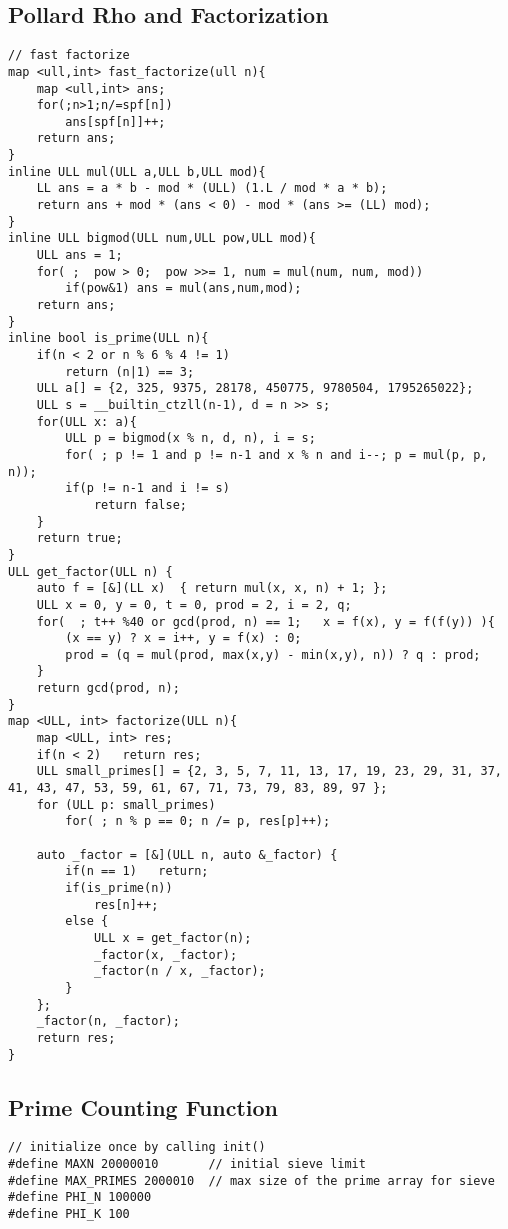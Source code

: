 \documentclass[10pt,a4paper,onesided]{article}
\begin{document}
\begin{multicols*}{3}
\subsection{Pollard Rho and Factorization}
\begin{lstlisting}
// fast factorize
map <ull,int> fast_factorize(ull n){
    map <ull,int> ans;
    for(;n>1;n/=spf[n])
        ans[spf[n]]++;
    return ans;
}
inline ULL mul(ULL a,ULL b,ULL mod){
    LL ans = a * b - mod * (ULL) (1.L / mod * a * b);
    return ans + mod * (ans < 0) - mod * (ans >= (LL) mod);
}
inline ULL bigmod(ULL num,ULL pow,ULL mod){
    ULL ans = 1;
    for( ;  pow > 0;  pow >>= 1, num = mul(num, num, mod))
        if(pow&1) ans = mul(ans,num,mod);
    return ans;
}
inline bool is_prime(ULL n){
    if(n < 2 or n % 6 % 4 != 1) 
        return (n|1) == 3;
    ULL a[] = {2, 325, 9375, 28178, 450775, 9780504, 1795265022};
    ULL s = __builtin_ctzll(n-1), d = n >> s;
    for(ULL x: a){
        ULL p = bigmod(x % n, d, n), i = s;
        for( ; p != 1 and p != n-1 and x % n and i--; p = mul(p, p, n));
        if(p != n-1 and i != s)
            return false;
    }
    return true;
}
ULL get_factor(ULL n) {
    auto f = [&](LL x)  { return mul(x, x, n) + 1; };
    ULL x = 0, y = 0, t = 0, prod = 2, i = 2, q;
    for(  ; t++ %40 or gcd(prod, n) == 1;   x = f(x), y = f(f(y)) ){
        (x == y) ? x = i++, y = f(x) : 0;
        prod = (q = mul(prod, max(x,y) - min(x,y), n)) ? q : prod;
    }
    return gcd(prod, n);
}
map <ULL, int> factorize(ULL n){
    map <ULL, int> res;
    if(n < 2)   return res;
    ULL small_primes[] = {2, 3, 5, 7, 11, 13, 17, 19, 23, 29, 31, 37, 41, 43, 47, 53, 59, 61, 67, 71, 73, 79, 83, 89, 97 };
    for (ULL p: small_primes)
        for( ; n % p == 0; n /= p, res[p]++);

    auto _factor = [&](ULL n, auto &_factor) {
        if(n == 1)   return;
        if(is_prime(n)) 
            res[n]++;
        else {
            ULL x = get_factor(n);
            _factor(x, _factor);
            _factor(n / x, _factor);
        }
    };
    _factor(n, _factor);
    return res;
}
\end{lstlisting}
\subsection{Prime Counting Function}
\begin{lstlisting}
// initialize once by calling init()
#define MAXN 20000010       // initial sieve limit
#define MAX_PRIMES 2000010  // max size of the prime array for sieve
#define PHI_N 100000
#define PHI_K 100


\end{lstlisting}
\end{multicols*}
\end{document}
